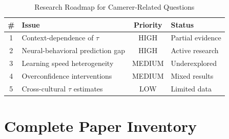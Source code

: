 \begin{table}[htbp]
\centering
\caption{Research Roadmap for Camerer-Related Questions}
\label{tab:ca-roadmap}
\renewcommand{\arraystretch}{1.3}
\begin{tabular}{@{}clcl@{}}
\toprule
\textbf{\#} & \textbf{Issue} & \textbf{Priority} & \textbf{Status} \\
\midrule
1 & Context-dependence of $\tau$ & HIGH & Partial evidence \\
2 & Neural-behavioral prediction gap & HIGH & Active research \\
3 & Learning speed heterogeneity & MEDIUM & Underexplored \\
4 & Overconfidence interventions & MEDIUM & Mixed results \\
5 & Cross-cultural $\tau$ estimates & LOW & Limited data \\
\bottomrule
\end{tabular}
\end{table}


\section{Complete Paper Inventory}
\label{sec:ca-papers}

